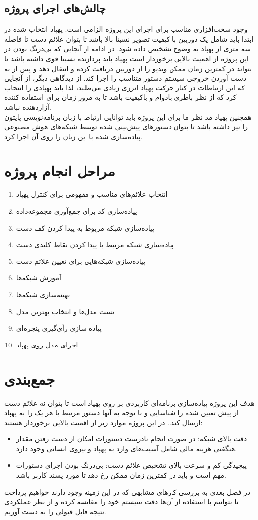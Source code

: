 \subsection{چالش‌های اجرای پروژه}
وجود سخت‌افزاری مناسب برای اجرای این پروژه الزامی است. پهپاد انتخاب شده در ابتدا باید شامل یک دوربین با کیفیت تصویر
نسبتا بالا باشد تا بتوان علائم دست تا فاصله سه متری از پهپاد به وضوح تشخيص داده شود.
در ادامه از آنجایی که بی‌درنگ بودن در این پروژه از اهمیت بالایی برخوردار است پهپاد باید پردازنده نسبتا قوی داشته باشد تا بتواند در کمترین زمان ممکن ویدیو را از دوربین دریافت کرده و انتقال دهد و پس از به دست آوردن خروجی سیستم دستور متناسب را اجرا کند. از دیدگاهی دیگر، از آنجایی که این ارتباطات در کنار حرکت پهپاد انرژی زیادی می‌طلبد، لذا باید پهپادی را انتخاب کرد
که از نظر باطری بادوام و باکیفیت باشد تا به مرور زمان برای استفاده کننده آزاردهنده نباشد.
\\
همچنین پهپاد مد نظر ما برای این پروژه باید توانایی ارتباط با  زبان برنامه‌نویسی پایتون را نیز داشته باشد تا بتوان دستورهای پیش‌بینی شده توسط شبکه‌های هوش مصنوعی پیاده‌سازی شده با این زبان را روی آن اجرا کرد.


\section{مراحل انجام پروژه}
\begin{enumerate}
    \item  انتخاب علائم‌های مناسب و مفهومی برای کنترل پهپاد
    \item  پیاده‌سازی کد برای جمع‌آوری مجموعه‌داده
    \item  پیاده‌سازی شبکه مربوط به پیدا کردن کف دست 
    \item  پیاده‌سازی شبکه مرتبط با پیدا کردن نقاط کلیدی دست 
    \item  پیاده‌سازی شبکه‌هایی برای تعیین علائم دست
    \item  آموزش شبکه‌ها
    \item  بهینه‌سازی شبکه‌ها
    \item  تست مدل‌ها و انتخاب بهترین مدل
    \item  پیاده سازی رأی‌گیری پنجره‌ای
    \item  اجرای مدل روی پهپاد
\end{enumerate}
 

\section{جمع‌بندی}
 هدف این پروژه پیاده‌سازی برنامه‌ای کاربردی بر روی پهپاد است تا بتوان نه علائم دست از پیش تعیین شده را شناسایی و با توجه به آنها دستور مرتبط با هر یک را به پهپاد ارسال کند..
 در این پروژه موارد زیر از اهمیت بالایی برخوردار هستند:
 \begin{itemize}
    \item دقت بالای شبکه: در صورت انجام نادرست دستورات امکان از دست رفتن مقدار هنگفتی هزینه مالی شامل آسیب‌های وارد به پهپاد و نیروی انسانی وجود دارد.
    \item پیچیدگی کم و سرعت بالای تشخیص علائم دست: بی‌درنگ بودن اجرای دستورات مهم است و باید در کمترین زمان ممکن رخ دهد تا مورد پسند کاربر باشد.
\end{itemize}

در فصل بعدی به بررسی کار‌های مشابهی که در این زمینه وجود دارند خواهیم پرداخت تا بتوانیم با استفاده از آن‌ها دقت سیستم خود را مقایسه کرده و از نظر 
عملکردی نتیجه قابل قبولی را به دست آوریم.


